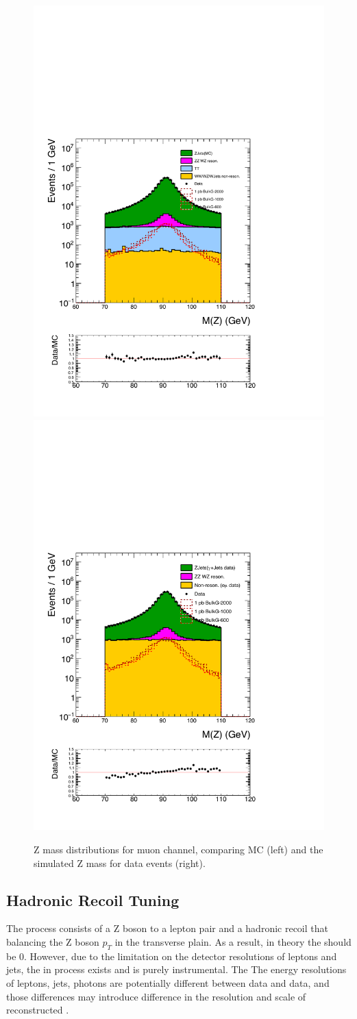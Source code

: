 \begin{figure}[htbp!]
\centering
\includegraphics[width=0.46\linewidth]{figures/MC2_Rc36p46DtReCalib_RhoWt_GMCEtaWt_tightzpt50_puWeightmoriondMC_metfilter_mu_log_1pb.pdf}
\includegraphics[width=0.46\linewidth]{figures/GJets2_BkgSub_Rc36p46DtReCalib_NonReso_RhoWt_GMCEtaWt_tightzpt50_puWeightmoriondMC_muoneg_gjet_metfilter_mu_log_1pb.pdf}
\caption{Z mass distributions for muon channel, comparing \Zjets MC (left) and the simulated Z mass for \gjets data events (right).}
\label{fig:mz_mu_zjets_gjets}
\end{figure}

\subsection{\boldmath{\ptmiss} Hadronic Recoil Tuning}\label{sec:gjetmet}
The \Zjets process consists of a Z boson to a lepton pair and a hadronic recoil that balancing the Z boson $p_T$ in the transverse plain. As a result, in theory the \ptmiss should be 0. However, due to the limitation on the detector resolutions of leptons and jets, the \ptmiss in \Zjets process exists and is purely instrumental. The \ptmiss The energy resolutions of leptons, jets, photons are potentially different between \gjets data and \Zjets data, and those differences may introduce difference in the resolution and scale of reconstructed \ptmiss.

